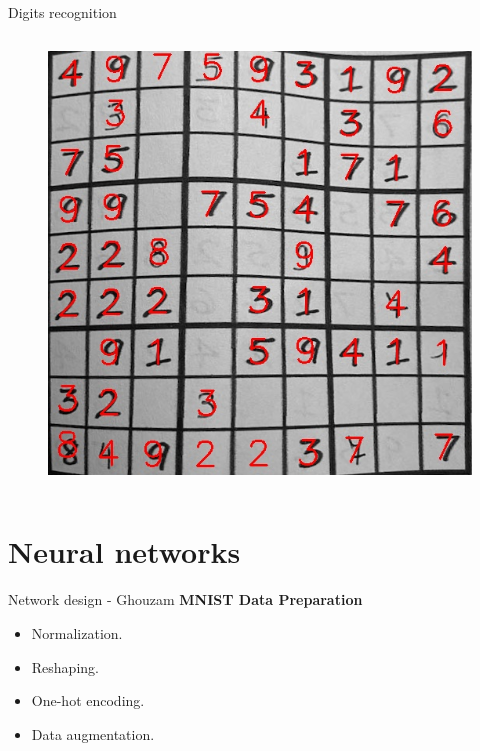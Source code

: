 \documentclass[12pt, dvipsnames]{beamer}
\begin{document}
\begin{frame}{Digits recognition}
    \begin{columns}
        \begin{figure}
            \centering
            \includegraphics[width=\textwidth]{resources/sudoku/sudoku_0025_07.jpg}
        \end{figure}
    \end{columns}
\end{frame}

\section{Neural networks}

\begin{frame}{Network design - Ghouzam}
    \textbf{MNIST Data Preparation}
    \begin{itemize}
        \item Normalization.
        \item Reshaping.
        \item One-hot encoding.
        \item Data augmentation.
    \end{itemize}
\end{frame}
\end{document}
